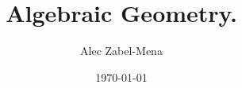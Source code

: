 \documentclass[12pt, twoside]{book}
\title{Algebraic Geometry.}
\author{Alec Zabel-Mena}
\date{\today}
\begin{document}
\maketitle
\tableofcontents
\newpage



\nocite{*}



\end{document}
